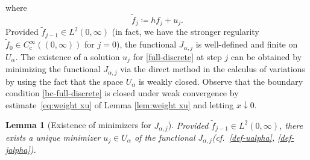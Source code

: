 \documentclass[reqno,12pt]{amsart}
\newtheorem{lemma}[theorem]{Lemma}
\numberwithin{equation}{section}
\begin{document}
%
where
%
\begin{equation}\label{def-gj}
\tilde f_j \coloneq h f_j + u_j. 
\end{equation}
%
Provided $\tilde f_{j-1}\in L^2(0,\infty)$ (in fact, we have the stronger regularity $\tilde f_0\in C^\infty_\mathrm{c}((0,\infty))$ for $j = 0$), the functional $J_{\alpha,j}$ is well-defined and finite on $U_\alpha$. The existence of a solution $u_j$ for \eqref{full-discrete} at step $j$ can be obtained by minimizing the functional $J_{\alpha,j}$ via the direct method in the calculus of variations by using the fact that the space $U_\alpha$ is weakly closed. Observe that the boundary condition \eqref{bc-full-discrete} is closed under weak convergence by estimate~\eqref{eq:weight xu} of Lemma \ref{lem:weight xu} and letting $x \downarrow 0$.

%
\begin{lemma}[Existence of minimizers for $J_{\alpha,j}$]\label{lem-ex-min}
Provided $\tilde f_{j-1} \in L^2(0,\infty)$, there exists a unique minimizer $u_j \in U_\alpha$ of the functional $J_{\alpha,j}$(cf.~\eqref{def-ualpha}, \eqref{def-jalpha}). 
\end{lemma}
%
\end{document}

